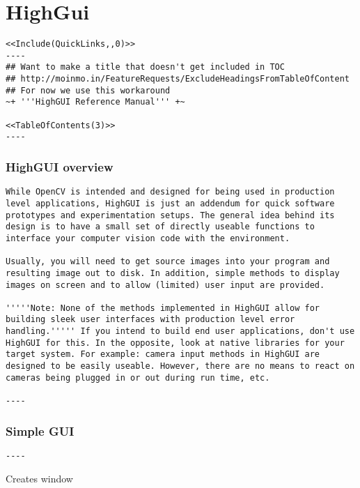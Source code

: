 \chapter{HighGui}
\begin{verbatim}
<<Include(QuickLinks,,0)>>
----
## Want to make a title that doesn't get included in TOC
## http://moinmo.in/FeatureRequests/ExcludeHeadingsFromTableOfContent
## For now we use this workaround
~+ '''HighGUI Reference Manual''' +~

<<TableOfContents(3)>>
----
\end{verbatim}
\subsection{HighGUI overview}
\begin{verbatim}
While OpenCV is intended and designed for being used in production level applications, HighGUI is just an addendum for quick software prototypes and experimentation setups. The general idea behind its design is to have a small set of directly useable functions to interface your computer vision code with the environment.

Usually, you will need to get source images into your program and resulting image out to disk. In addition, simple methods to display images on screen and to allow (limited) user input are provided.

'''''Note: None of the methods implemented in HighGUI allow for building sleek user interfaces with production level error handling.''''' If you intend to build end user applications, don't use HighGUI for this. In the opposite, look at native libraries for your target system. For example: camera input methods in HighGUI are designed to be easily useable. However, there are no means to react on cameras being plugged in or out during run time, etc.

----

\end{verbatim}
\subsection{Simple GUI}
\begin{verbatim}
----

\end{verbatim}


Creates window


